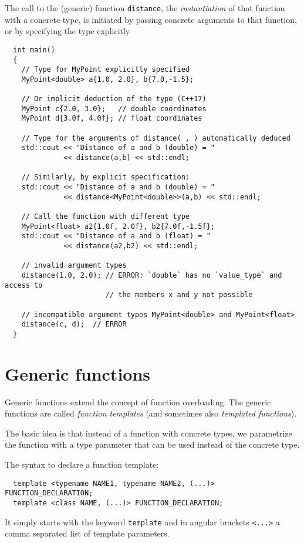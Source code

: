 The call to the (generic) function \texttt{distance}, \ie the \emph{instantiation} of that function with a concrete type, is
initiated by passing concrete arguments to that function, or by specifying the type explicitly
\begin{verbatim}
  int main()
  {
    // Type for MyPoint explicitly specified
    MyPoint<double> a{1.0, 2.0}, b{7.0,-1.5};

    // Or implicit deduction of the type (C++17)
    MyPoint c{2.0, 3.0};   // double coordinates
    MyPoint d{3.0f, 4.0f}; // float coordinates

    // Type for the arguments of distance( , ) automatically deduced
    std::cout << "Distance of a and b (double) = "
              << distance(a,b) << std::endl;

    // Similarly, by explicit specification:
    std::cout << "Distance of a and b (double) = "
              << distance<MyPoint<double>>(a,b) << std::endl;

    // Call the function with different type
    MyPoint<float> a2{1.0f, 2.0f}, b2{7.0f,-1.5f};
    std::cout << "Distance of a and b (float) = "
              << distance(a2,b2) << std::endl;

    // invalid argument types
    distance(1.0, 2.0); // ERROR: `double` has no `value_type` and access to
                        // the members x and y not possible

    // incompatible argument types MyPoint<double> and MyPoint<float>
    distance(c, d);  // ERROR
  }
\end{verbatim}


\section{Generic functions}
Generic functions extend the concept of function overloading. The generic functions are called \emph{function templates} (and sometimes also
\emph{templated functions}).

The basic idea is that instead of a function with concrete types, we parametrize the function with a type parameter that can be used
instead of the concrete type.

The syntax to declare a function template:
\begin{verbatim}
  template <typename NAME1, typename NAME2, (...)> FUNCTION_DECLARATION;
  template <class NAME, (...)> FUNCTION_DECLARATION;
\end{verbatim}
It simply starts with the keyword \texttt{template} and in angular brackets \texttt{<...>} a comma separated list of template parameters.

